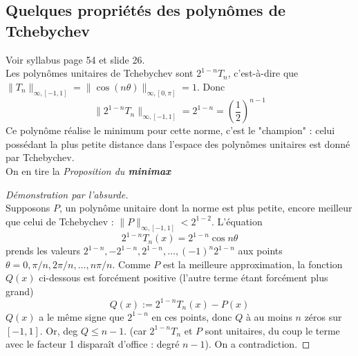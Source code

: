 \setcounter{subsection}{3}
\subsection{Quelques propriétés des polynômes de Tchebychev}
Voir syllabus page 54 et slide 26.\\
Les polynômes unitaires de Tchebychev sont $2^{1-n}T_n$, c'est-à-dire que $\|T_n
\|_{\infty, [-1,1]} = \|\cos(n\theta)\|_{\infty, [0,\pi]} = 1$. Donc 
\begin{equation}
	\|2^{1-n}T_n\|_{\infty,[-1,1]} = 2^{1-n} = \left(\frac{1}{2}\right)^{n-1}
\end{equation}
Ce polynôme réalise le minimum pour cette norme, c'est le "champion" : celui 
possédant la plus petite distance dans l'espace des polynômes unitaires est 
donné par Tchebychev.\\
On en tire la \textit{Proposition du \textbf{minimax}}\\
\begin{proof} [Démonstration par l'absurde]\ \\
	Supposons $P$, un polynôme unitaire dont la norme est plus petite, encore 
	meilleur que celui de Tchebychev : $\|P\|_{\infty, [-1,1]} < 2^{1-2}$. L'équation
	\begin{equation}
		2^{1-n}T_n(x) = 2^{1-n}\cos n\theta
	\end{equation}
	prends les valeurs $2^{1-n}, -2^{1-n}, 2^{1-n}, \dots, (-1)^n2^{1-n}$ aux points 
	$\theta = 0, \pi/n, 2\pi/n, \dots, n\pi/n$. Comme $P$ est la meilleure 
	approximation, la fonction $Q(x)$ ci-dessous est forcément positive (l'autre 
	terme étant forcément plus grand)
	\begin{equation}
		Q(x) := 2^{1-n}T_n(x) - P(x)
	\end{equation}
	$Q(x)$ a le même signe que $2^{1-n}$ en ces points, donc $Q$ à au moins $n$ 
	zéros sur $[-1,1]$. Or, deg $Q \leq n-1.$ (car $2^{1-n}T_n$ et $P$ sont unitaires, 
	du coup le terme avec le facteur 1 disparaît d'office : degré $n-1$). On a 
	contradiction.
\end{proof}
	

